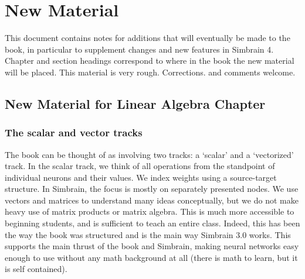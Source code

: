 \chapter{New Material}

This document contains notes for additions that will eventually be made to the book, in particular to supplement changes and new features in Simbrain 4. Chapter and section headings correspond to where in the book the new material will be placed. This material is very rough. Corrections. and comments welcome.

\section{New Material for Linear Algebra Chapter}

 
\subsection{The scalar and vector tracks}



The book  can be thought of as involving two tracks: a `scalar' and a `vectorized' track. In the scalar track, we think of all operations from the standpoint of individual neurons and their values. We index weights using a source-target structure. In Simbrain, the focus is mostly on separately presented nodes. We use vectors and matrices to understand many ideas conceptually, but we do not make heavy use of matrix products or matrix algebra. This is much more accessible to beginning students, and is sufficient to teach an entire class. Indeed, this has been the way the book was structured and is the main way Simbrain 3.0 works. This supports the main thrust of the book and Simbrain, making neural networks easy enough to use without any math background at all (there is math to learn, but it is self contained). 

